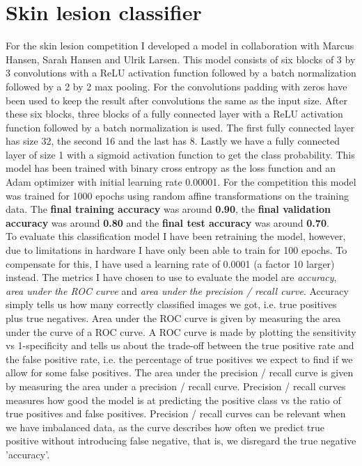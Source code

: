 \section{Skin lesion classifier}
For the skin lesion competition I developed a model in collaboration with Marcus Hansen, Sarah Hansen and Ulrik Larsen. This model consists of six blocks of 3 by 3 convolutions with a ReLU activation function followed by a batch normalization followed by a 2 by 2 max pooling. For the convolutions padding with zeros have been used to keep the result after convolutions the same as the input size. After these six blocks, three blocks of a fully connected layer with a ReLU activation function followed by a batch normalization is used. The first fully connected layer has size 32, the second 16 and the last has 8. Lastly we have a fully connected layer of size 1 with a sigmoid activation function to get the class probability. This model has been trained with binary cross entropy as the loss function and an Adam optimizer with initial learning rate 0.00001. For the competition this model was trained for 1000 epochs using random affine transformations on the training data. The \textbf{final training accuracy} was around \textbf{0.90}, the \textbf{final validation accuracy} was around \textbf{0.80} and the \textbf{final test accuracy} was around \textbf{0.70}.\\
To evaluate this classification model I have been retraining the model, however, due to limitations in hardware I have only been able to train for 100 epochs. To compensate for this, I have used a learning rate of 0.0001 (a factor 10 larger) instead. The metrics I have chosen to use to evaluate the model are \textit{accuracy}, \textit{area under the ROC curve} and \textit{area under the precision / recall curve}. Accuracy simply tells us how many correctly classified images we got, i.e. true positives plus true negatives. Area under the ROC curve is given by measuring the area under the curve of a ROC curve. A ROC curve is made by plotting the sensitivity vs 1-specificity and tells us about the trade-off between the true positive rate and the false positive rate, i.e. the percentage of true positives we expect to find if we allow for some false positives. The area under the precision / recall curve is given by measuring the area under a precision / recall curve. Precision / recall curves measures how good the model is at predicting the positive class vs the ratio of true positives and false positives. Precision / recall curves can be relevant when we have imbalanced data, as the curve describes how often we predict true positive without introducing false negative, that is, we disregard the true negative 'accuracy'.

